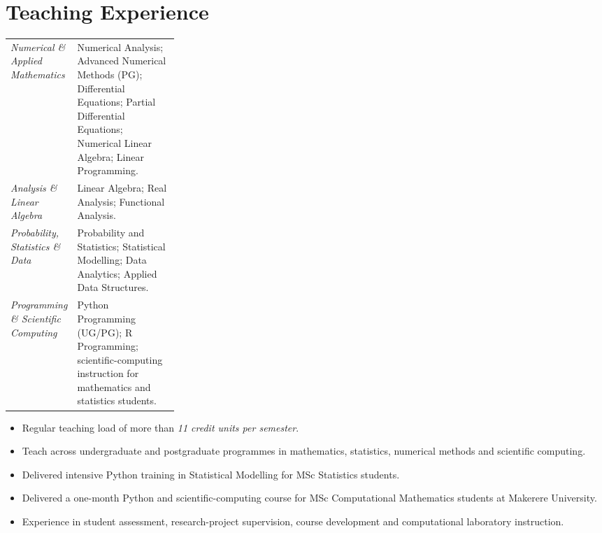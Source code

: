 \documentclass[11pt,a4paper]{article}
\begin{document}
\section{Teaching Experience}

\begin{tabularx}{\linewidth}
{@{}>{\raggedright\arraybackslash}p{0.28\linewidth} X@{}}

\textit{Numerical \& Applied Mathematics}
&
Numerical Analysis; Advanced Numerical Methods (PG);
Differential Equations; Partial Differential Equations;
Numerical Linear Algebra; Linear Programming.
\\[3pt]

\textit{Analysis \& Linear Algebra}
&
Linear Algebra; Real Analysis; Functional Analysis.
\\[3pt]

\textit{Probability, Statistics \& Data}
&
Probability and Statistics; Statistical Modelling;
Data Analytics; Applied Data Structures.
\\[3pt]

\textit{Programming \& Scientific Computing}
&
Python Programming (UG/PG); R Programming;
scientific-computing instruction for mathematics and statistics students.

\end{tabularx}

\vspace{3pt}

\begin{itemize}

\item
Regular teaching load of more than \textit{11 credit units per semester}.

\item
Teach across undergraduate and postgraduate programmes in
mathematics, statistics, numerical methods and scientific computing.

\item
Delivered intensive Python training in Statistical Modelling
for MSc Statistics students.

\item
Delivered a one-month Python and scientific-computing course
for MSc Computational Mathematics students at Makerere University.

\item
Experience in student assessment, research-project supervision,
course development and computational laboratory instruction.

\end{itemize}
\end{document}
